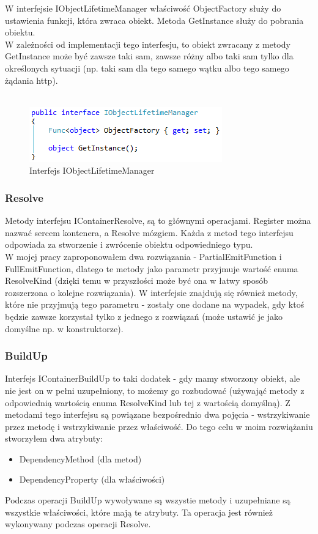 \documentclass[12pt]{article}
\begin{document}
W interfejsie IObjectLifetimeManager właściwość ObjectFactory służy do ustawienia funkcji, która zwraca obiekt. Metoda GetInstance służy do pobrania obiektu.\\
W zależności od implementacji tego interfesju, to obiekt zwracany z metody GetInstance może być zawsze taki sam, zawsze różny albo taki sam tylko dla określonych sytuacji (np. taki sam dla tego samego wątku albo tego samego żądania http).\\ \\
\begin{figure}[H]
	\begin{center}
  		\includegraphics{IObjectLifetimeManager.png}
  		\caption{Interfejs IObjectLifetimeManager}
  		\label{fig:IObjectLifetimeManager}
	\end{center}
\end{figure}

\subsubsection{Resolve}
Metody interfejsu IContainerResolve, są to głównymi operacjami. Register można nazwać sercem kontenera, a Resolve mózgiem. Każda z metod tego interfejsu odpowiada za stworzenie i zwrócenie obiektu odpowiedniego typu.\\
W mojej pracy zaproponowałem dwa rozwiązania - PartialEmitFunction i FullEmitFunction, dlatego te metody jako parametr przyjmuje wartość enuma ResolveKind (dzięki temu w przyszłości może być ona w łatwy sposób rozszerzona o kolejne rozwiązania). W interfejsie znajdują się również metody, które nie przyjmują tego parametru - zostały one dodane na wypadek, gdy ktoś będzie zawsze korzystał tylko z jednego z rozwiązań (może ustawić je jako domyślne np. w konstruktorze).

\subsubsection{BuildUp}
Interfejs IContainerBuildUp to taki dodatek - gdy mamy stworzony obiekt, ale nie jest on w pełni uzupełniony, to możemy go rozbudować (używająć metody z odpowiednią wartością enuma ResolveKind lub tej z wartością domyślną). Z metodami tego interfejsu są powiązane bezpośrednio dwa pojęcia - wstrzykiwanie przez metodę i wstrzykiwanie przez właściwość. Do tego celu w moim rozwiążaniu stworzyłem dwa atrybuty:
\begin{itemize}
	\item DependencyMethod (dla metod)
	\item DependencyProperty (dla właściwości)
\end{itemize}
Podczas operacji BuildUp wywoływane są wszystie metody i uzupełniane są wszystkie właściwości, które mają te atrybuty. Ta operacja jest również wykonywany podczas operacji Resolve.\\
\end{document}
